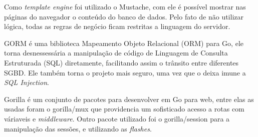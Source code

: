Como \textit{template engine} foi utilizado o Mustache, com ele é possível mostrar nas páginas do navegador o conteúdo do banco de dados. Pelo fato de não utilizar lógica, todas as regras de negócio ficam restritas a linguagem do servidor.

GORM é uma biblioteca Mapeamento Objeto Relacional (ORM) para Go, ele torna desnessessária a manipulação de código de Linguagem de Consulta Estruturada (SQL) diretamente, facilitando assim o trânsito entre diferentes SGBD. Ele também torna o projeto mais seguro, uma vez que o deixa imune a \textit{SQL Injection}.

Gorilla é um conjunto de pacotes para desenvolver em Go para web, entre elas as usadas foram o gorilla/mux que providencia um sofisticado acesso a rotas com váriaveis e \textit{middleware}. Outro pacote utilizado foi o gorilla/session para a manipulação das sessões, e utilizando as \textit{flashes}.
